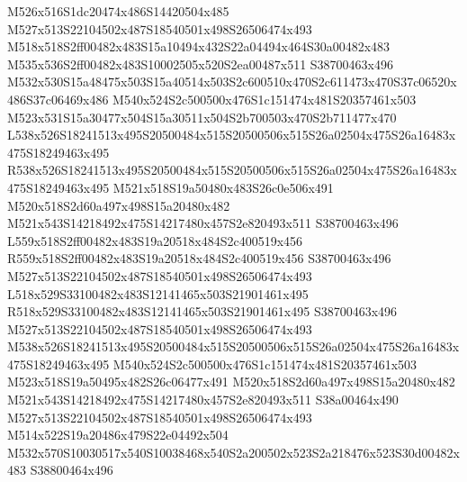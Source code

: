 \documentclass{article}
\begin{document}
\begin{multicols}{2}
M526x516S1dc20474x486S14420504x485 M527x513S22104502x487S18540501x498S26506474x493 M518x518S2ff00482x483S15a10494x432S22a04494x464S30a00482x483 M535x536S2ff00482x483S10002505x520S2ea00487x511 S38700463x496 M532x530S15a48475x503S15a40514x503S2c600510x470S2c611473x470S37c06520x486S37c06469x486 M540x524S2c500500x476S1c151474x481S20357461x503 M523x531S15a30477x504S15a30511x504S2b700503x470S2b711477x470 L538x526S18241513x495S20500484x515S20500506x515S26a02504x475S26a16483x475S18249463x495 R538x526S18241513x495S20500484x515S20500506x515S26a02504x475S26a16483x475S18249463x495 M521x518S19a50480x483S26c0e506x491 M520x518S2d60a497x498S15a20480x482 M521x543S14218492x475S14217480x457S2e820493x511 S38700463x496 L559x518S2ff00482x483S19a20518x484S2c400519x456 R559x518S2ff00482x483S19a20518x484S2c400519x456 S38700463x496 M527x513S22104502x487S18540501x498S26506474x493 L518x529S33100482x483S12141465x503S21901461x495 R518x529S33100482x483S12141465x503S21901461x495 S38700463x496 M527x513S22104502x487S18540501x498S26506474x493 M538x526S18241513x495S20500484x515S20500506x515S26a02504x475S26a16483x475S18249463x495 M540x524S2c500500x476S1c151474x481S20357461x503 M523x518S19a50495x482S26c06477x491 M520x518S2d60a497x498S15a20480x482 M521x543S14218492x475S14217480x457S2e820493x511 S38a00464x490 M527x513S22104502x487S18540501x498S26506474x493 M514x522S19a20486x479S22e04492x504 M532x570S10030517x540S10038468x540S2a200502x523S2a218476x523S30d00482x483 S38800464x496


\end{multicols}
\end{document}
